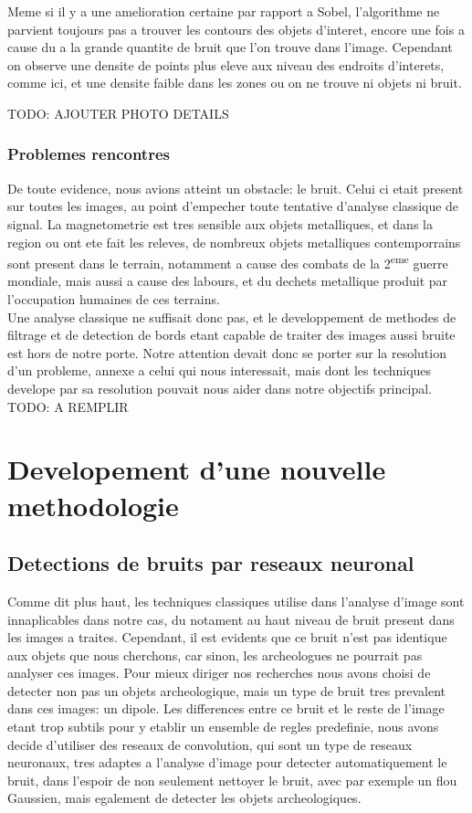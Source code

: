 \documentclass[a4paper, 12pt, titlepage, oneside]{article}
\begin{document}
	Meme si il y a une amelioration certaine par rapport a Sobel, l'algorithme ne parvient toujours pas a trouver les contours des objets d'interet, encore une fois a cause du a la grande quantite de bruit que l'on trouve dans l'image. Cependant  on observe une densite de points plus eleve aux niveau des endroits d'interets, comme ici, et une densite faible dans les zones ou on ne trouve ni objets ni bruit.
	
	TODO: AJOUTER PHOTO DETAILS 
	

	
	\subsubsection{Problemes rencontres}
	De toute evidence, nous avions atteint un obstacle: le bruit. Celui ci etait present sur toutes les images, au point d'empecher toute tentative d'analyse classique de signal. La magnetometrie est tres sensible aux objets metalliques, et dans la region ou ont ete fait les releves, de nombreux objets metalliques contemporrains sont present dans le terrain, notamment a cause des combats de la 2\textsuperscript{eme} guerre mondiale, mais aussi a cause des labours, et du dechets metallique produit par l'occupation humaines de ces terrains.\\
	Une analyse classique ne suffisait donc pas, et le developpement de methodes de filtrage et de detection de bords etant capable de traiter des images aussi bruite est hors de notre porte. Notre attention devait donc se porter sur la resolution d'un probleme, annexe a celui qui nous interessait, mais dont les techniques develope par sa resolution pouvait nous aider dans notre objectifs principal.
	TODO: A REMPLIR
	
\newpage
\section{Developement d'une nouvelle methodologie}
	\subsection{Detections de bruits par reseaux neuronal}
	Comme dit plus haut, les techniques classiques utilise dans l'analyse d'image sont innaplicables dans notre cas, du notament au haut niveau de bruit present dans les images a traites. Cependant, il est evidents que ce bruit n'est pas identique aux objets que nous cherchons, car sinon, les archeologues ne pourrait pas analyser ces images. Pour mieux diriger nos recherches nous avons choisi de detecter non pas un objets archeologique, mais un type de bruit tres prevalent dans ces images: un dipole. Les differences entre ce bruit et le reste de l'image etant trop subtils pour y etablir un ensemble de regles predefinie, nous avons decide d'utiliser des reseaux de convolution, qui sont un type de reseaux neuronaux, tres adaptes a l'analyse d'image pour detecter automatiquement le bruit, dans l'espoir de non seulement nettoyer le bruit, avec par exemple un flou Gaussien, mais egalement de detecter les objets archeologiques.
\end{document}
